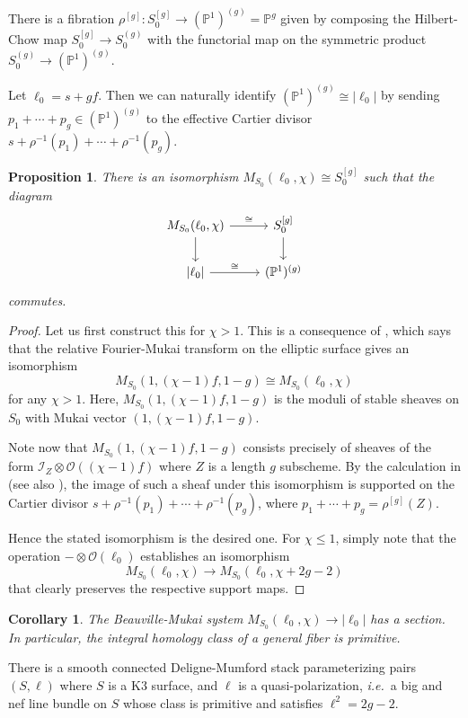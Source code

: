 \documentclass{amsart}
\theoremstyle{plain}
\newtheorem{proposition}[theorem]{Proposition}
\newtheorem{corollary}[theorem]{Corollary}
\theoremstyle{definition}
\theoremstyle{remark}
\begin{document}
There is a fibration $\rho^{[g]}:S_0^{[g]}\to(\mathbb P^1)^{(g)}=\mathbb P^g$ given by composing the Hilbert-Chow map $S_0^{[g]}\to S_0^{(g)}$ with the functorial map on the symmetric product $S_0^{(g)}\to (\mathbb P^1)^{(g)}$.

Let $\ell_0=s+gf$.
Then we can naturally identify $(\mathbb P^1)^{(g)}\cong |\ell_0|$ by sending $p_1+\cdots+p_g\in (\mathbb P^1)^{(g)}$ to the effective Cartier divisor $s+\rho^{-1}(p_1)+\cdots+\rho^{-1}(p_g)$.
\begin{proposition}
    There is an isomorphism $M_{S_0}(\ell_0,\chi)\cong S_0^{[g]}$ such that the diagram
    \[\begin{tikzcd}
        M_{S_0}(\ell_0,\chi)\dar \rar{\cong} & S_0^{[g]} \dar\\
        {|\ell_0|} \rar{\cong} & (\mathbb P^1)^{(g)}
    \end{tikzcd}\]
    commutes.
\end{proposition}
\begin{proof}
    Let us first construct this for $\chi>1$.
    This is a consequence of \cite[Theorem 3.15]{yoshioka}, which says that the relative Fourier-Mukai transform on the elliptic surface gives an isomorphism
    \[M_{S_0}(1,(\chi-1)f,1-g)\cong M_{S_0}(\ell_0,\chi)\]
    for any $\chi>1$.
    Here, $M_{S_0}(1,(\chi-1)f,1-g)$ is the moduli of stable sheaves on $S_0$ with Mukai vector $(1,(\chi-1)f,1-g)$.

    Note now that $M_{S_0}(1,(\chi-1)f,1-g)$ consists precisely of sheaves of the form $\mathcal I_Z\otimes\mathcal O((\chi-1)f)$ where $Z$ is a length $g$ subscheme.
    By the calculation in \cite[(3.15)]{yoshioka} (see also \cite{bai2025}), the image of such a sheaf under this isomorphism is supported on the Cartier divisor $s+\rho^{-1}(p_1)+\cdots+\rho^{-1}(p_g)$, where $p_1+\cdots+p_g=\rho^{[g]}(Z)$.

    Hence the stated isomorphism is the desired one.
    For $\chi\le 1$, simply note that the operation $-\otimes\mathcal O(\ell_0)$ establishes an isomorphism
    \[M_{S_0}(\ell_0,\chi)\to M_{S_0}(\ell_0,\chi+2g-2)\]
    that clearly preserves the respective support maps.
\end{proof}
\begin{corollary}
    The Beauville-Mukai system $M_{S_0}(\ell_0,\chi)\to |\ell_0|$ has a section.
    In particular, the integral homology class of a general fiber is primitive.
\end{corollary}
There is a smooth connected Deligne-Mumford stack parameterizing pairs $(S,\ell)$ where $S$ is a K3 surface, and $\ell$ is a quasi-polarization, \emph{i.e.}~a big and nef line bundle on $S$ whose class is primitive and satisfies $\ell^2=2g-2$.
\end{document}
